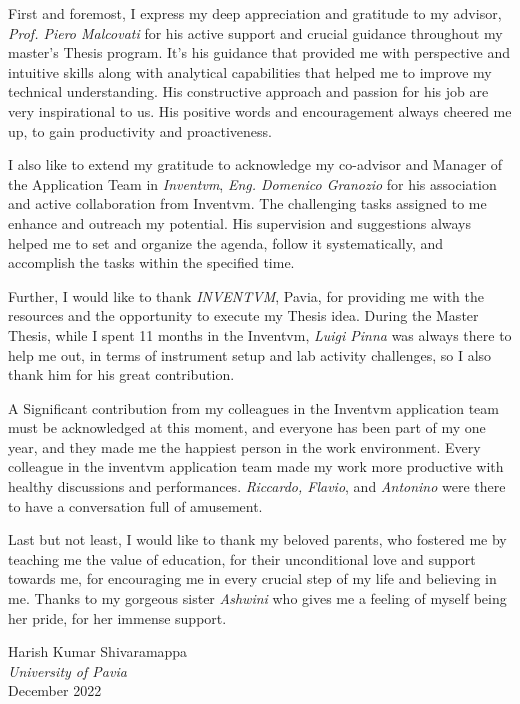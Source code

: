 \thispagestyle{empty} 

\noindent First and foremost, I express my deep appreciation and gratitude to my advisor,
\textit{Prof. Piero Malcovati} for his active support and crucial guidance throughout my master's Thesis program. It’s his guidance that provided me with perspective and intuitive skills along with analytical capabilities that helped me to improve my technical
understanding. His constructive approach and passion for his job are very inspirational to us. His positive words and encouragement always cheered me up, to gain productivity and proactiveness.

I also like to extend my gratitude to acknowledge my co-advisor and Manager of the Application Team in \textit{Inventvm}, \textit{Eng. Domenico Granozio} for his association and active collaboration from Inventvm. The challenging tasks assigned to me enhance and outreach my potential. His supervision and
suggestions always helped me to set and organize the agenda, follow it systematically, and accomplish the tasks within the specified time.


Further, I would like to thank \textit{INVENTVM}, Pavia, for providing me with the resources and the opportunity to execute my Thesis idea. During the Master Thesis, while I spent 11 months in the Inventvm, \textit{Luigi Pinna} was always there to help me out, in terms of instrument setup and lab activity challenges, so I also thank him for his great contribution.

A Significant contribution from my colleagues in the Inventvm application team must be acknowledged at this moment, and everyone has been part of my one year, and they made me the happiest person in the work environment. Every colleague in the inventvm application team made my work more productive with healthy discussions and performances. \textit{Riccardo, Flavio}, and \textit{Antonino} were there to have a conversation full of amusement.

Last but not least, I would like to thank my beloved parents, who fostered me by teaching me the value of education, for their unconditional love and support towards me, for encouraging me in every crucial step of my life and believing in me. Thanks to my gorgeous sister \textit{Ashwini} who gives me a feeling of myself being her pride, for her immense support.

\begin{flushright}
    Harish Kumar Shivaramappa\\
    \textit{University of Pavia}\\
    December 2022
\end{flushright}


